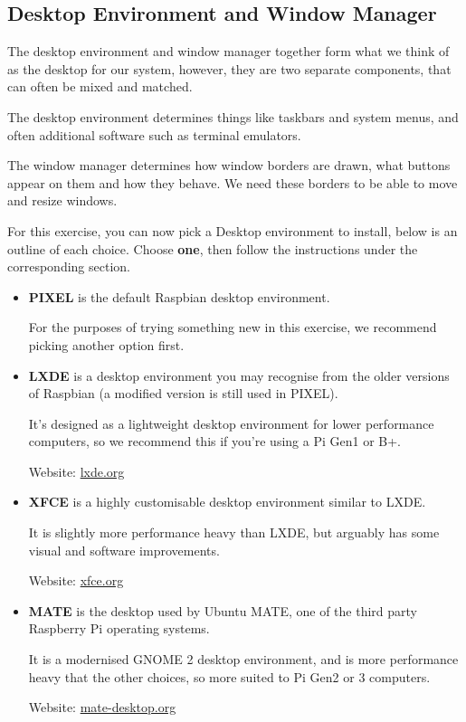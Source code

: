 	\subsection{Desktop Environment and Window Manager}
	
		The desktop environment and window manager together form what we think of as the desktop for our system, however, they are two separate components, that can often be mixed and matched.
		
		The desktop environment determines things like taskbars and system menus, and often additional software such as terminal emulators.
		
		The window manager determines how window borders are drawn, what buttons appear on them and how they behave. We need these borders to be able to move and resize windows.
	
		For this exercise, you can now pick a Desktop environment to install, below is an outline of each choice. Choose \textbf{one}, then follow the instructions under the corresponding section.
		
		\begin{itemize}
			\item \textbf{PIXEL} is the default Raspbian desktop environment.
			
			For the purposes of trying something new in this exercise, we recommend picking another option first.
			
			\item \textbf{LXDE} is a desktop environment you may recognise from the older versions of Raspbian (a modified version is still used in PIXEL).
			
			It's designed as a lightweight desktop environment for lower performance computers, so we recommend this if you're using a Pi Gen1 or B+.
			
			Website: \mbox{\href{http://lxde.org/}{lxde.org}}
			
			\item \textbf{XFCE} is a highly customisable desktop environment similar to LXDE.
			
			It is slightly more performance heavy than LXDE, but arguably has some visual and software improvements.
			
			Website: \mbox{\href{https://www.xfce.org/}{xfce.org}}
			
			\item \textbf{MATE} is the desktop used by Ubuntu MATE, one of the third party Raspberry Pi operating systems.
			
			It is a modernised GNOME 2 desktop environment, and is more performance heavy that the other choices, so more suited to Pi Gen2 or 3 computers.
			
			Website: \mbox{\href{https://mate-desktop.org/}{mate-desktop.org}}
		\end{itemize}
		
